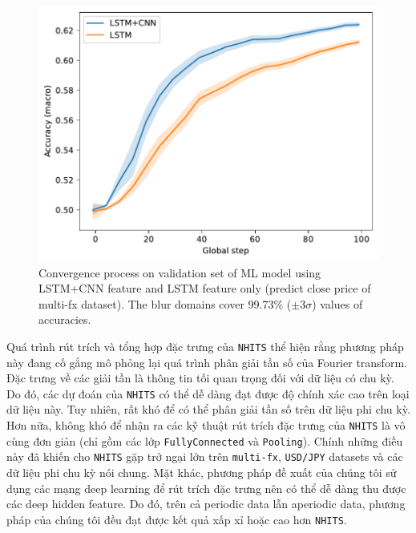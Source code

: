 \documentclass[aps,prb,groupedaddress,twocolumn,showpacs,dvipdfmx,superscriptaddress,pdftex]{revtex4-2}
\begin{document}
\begin{figure}
    \centering
    \includegraphics[width=\linewidth]{img/acc.pdf}
    \caption{Convergence process on validation set of ML model using LSTM+CNN feature and LSTM feature only (predict close price of multi-fx dataset). The blur domains cover 99.73\% ($±3\sigma$) values of accuracies.}
    \label{fig:lstm_cnn_feature}
\end{figure}

Quá trình rút trích và tổng hợp đặc trưng của \verb|NHITS| thể hiện rằng phương pháp này đang cố gắng mô phỏng lại quá trình phân giải tần số của Fourier transform. Đặc trưng về các giải tần là thông tin tối quan trọng đối với dữ liệu có chu kỳ. Do đó, các dự đoán của \verb|NHITS| có thể dễ dàng đạt được độ chính xác cao trên loại dữ liệu này. Tuy nhiên, rất khó để có thể phân giải tần số trên dữ liệu phi chu kỳ. Hơn nữa, không khó để nhận ra các kỹ thuật rút trích đặc trưng của \verb|NHITS| là vô cùng đơn giản (chỉ gồm các lớp \verb|FullyConnected| và \verb|Pooling|). Chính những điều này đã khiến cho \verb|NHITS| gặp trở ngại lớn trên \verb|multi-fx|, \verb|USD/JPY| datasets và các dữ liệu phi chu kỳ nói chung. Mặt khác, phương pháp đề xuất của chúng tôi sử dụng các mạng deep learning để rút trích đặc trưng nên có thể dễ dàng thu được các deep hidden feature. Do đó, trên cả periodic data lẫn aperiodic data, phương pháp của chúng tôi đều đạt được kết quả xấp xỉ hoặc cao hơn \verb|NHITS|.
\end{document}
